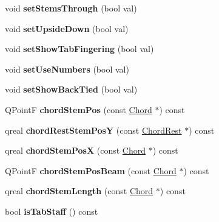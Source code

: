 \begin{DoxyCompactItemize}
void {\bfseries set\+Stems\+Through} (bool val)
\item 
\mbox{\label{class_ms_1_1_staff_type_a00375969d5611aa216f301187e128c4d}} 
void {\bfseries set\+Upside\+Down} (bool val)
\item 
\mbox{\label{class_ms_1_1_staff_type_a8775816e8589aa3e79adb554883126c1}} 
void {\bfseries set\+Show\+Tab\+Fingering} (bool val)
\item 
\mbox{\label{class_ms_1_1_staff_type_a494896f5d651a36d0ad9703f8280a0fd}} 
void {\bfseries set\+Use\+Numbers} (bool val)
\item 
\mbox{\label{class_ms_1_1_staff_type_af36c87ec6bc4c1e8951d61d4272ebea3}} 
void {\bfseries set\+Show\+Back\+Tied} (bool val)
\item 
\mbox{\label{class_ms_1_1_staff_type_aff6734454edd84c11694f21802162925}} 
Q\+PointF {\bfseries chord\+Stem\+Pos} (const \hyperlink{class_ms_1_1_chord}{Chord} $\ast$) const
\item 
\mbox{\label{class_ms_1_1_staff_type_ad607893a454afcf612eddc04f5542789}} 
qreal {\bfseries chord\+Rest\+Stem\+PosY} (const \hyperlink{class_ms_1_1_chord_rest}{Chord\+Rest} $\ast$) const
\item 
\mbox{\label{class_ms_1_1_staff_type_a8c3babe2c79455987254d9d809c109b9}} 
qreal {\bfseries chord\+Stem\+PosX} (const \hyperlink{class_ms_1_1_chord}{Chord} $\ast$) const
\item 
\mbox{\label{class_ms_1_1_staff_type_ab204303b66d4dfb1177b7b44e28f615e}} 
Q\+PointF {\bfseries chord\+Stem\+Pos\+Beam} (const \hyperlink{class_ms_1_1_chord}{Chord} $\ast$) const
\item 
\mbox{\label{class_ms_1_1_staff_type_ac0189828ce7ef909320a45aa6f9a8644}} 
qreal {\bfseries chord\+Stem\+Length} (const \hyperlink{class_ms_1_1_chord}{Chord} $\ast$) const
\item 
\mbox{\label{class_ms_1_1_staff_type_ab9810191075c3ba102d90f1e427c8803}} 
bool {\bfseries is\+Tab\+Staff} () const
\end{DoxyCompactItemize}
